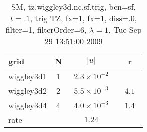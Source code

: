\begin{table}[hbt]\tableFont %
\begin{center}
\begin{tabular}{|l|c|c|c|} \hline 
grid  & N &  $\vert u \vert$   & r \\ \hline 
          wiggley3d1 &     1 & ~$2.3\times10^{ -2}$~ &            \\ \hline
          wiggley3d2 &     2 & ~$5.5\times10^{ -3}$~ & ~$  4.1$~  \\ \hline
          wiggley3d4 &     4 & ~$4.0\times10^{ -3}$~ & ~$  1.4$~  \\ \hline
    rate             &       &       $1.24$         &        \\ \hline
\end{tabular}
\caption{SM, tz.wiggley3d.nc.sf.trig, bcn=sf, $t=.1$, trig TZ, fx=1, fx=1, diss=.0, filter=1, filterOrder=6, $\lambda=1$, Tue Sep 29 13:51:00 2009}\label{table:tz.wiggley3d.nc.sf.trig}
\end{center}
\end{table}
